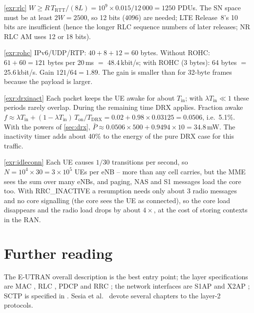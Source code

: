 \documentclass[11pt,a4paper]{article}
\begin{document}
\begin{solutionbox}{\ref{exr:rlc}}
$W \ge R\,T_{\mathrm{RTT}}/(8L) = 10^9\times0.015/12\,000 = 1250$ PDUs. The SN space must be at least
$2W = 2500$, so 12 bits ($4096$) are needed; LTE Release~8's 10 bits are insufficient (hence the
longer RLC sequence numbers of later releases; NR RLC AM uses 12 or 18 bits).
\end{solutionbox}

\begin{solutionbox}{\ref{exr:rohc}}
IPv6/UDP/RTP: $40+8+12 = 60$ bytes. Without ROHC: $61+60 = 121$ bytes per 20\,ms $=$ 48.4\,kbit/s;
with ROHC (3 bytes): 64 bytes $=$ 25.6\,kbit/s. Gain $121/64 = 1.89$. The gain is smaller than for
32-byte frames because the payload is larger.
\end{solutionbox}

\begin{solutionbox}{\ref{exr:drxinact}}
Each packet keeps the UE awake for about $T_{\mathrm{in}}$; with $\lambda T_{\mathrm{in}} \ll 1$ these
periods rarely overlap. During the remaining time DRX applies. Fraction awake
$f \approx \lambda T_{\mathrm{in}} + (1-\lambda T_{\mathrm{in}})\,T_{\mathrm{on}}/T_{\mathrm{DRX}}
= 0.02 + 0.98\times0.03125 = 0.0506$, i.e.\ 5.1\%. With the powers of \cref{sec:drx},
$\bar P \approx 0.0506\times500 + 0.9494\times10 = 34.8$\,mW. The inactivity timer adds about 40\% to
the energy of the pure DRX case for this traffic.
\end{solutionbox}

\begin{solutionbox}{\ref{exr:idleconn}}
Each UE causes $1/30$ transitions per second, so $N = 10^4\times30 = 3\times10^5$ UEs per eNB --
more than any cell carries, but the MME sees the sum over many eNBs, and paging, NAS and S1 messages
load the core too. With RRC\_INACTIVE a resumption needs only about 3 radio messages and no core
signalling (the core sees the UE as connected), so the core load disappears and the radio load drops
by about $4\times$, at the cost of storing contexts in the RAN.
\end{solutionbox}

\section{Further reading}
The E-UTRAN overall description \cite{ts36300} is the best entry point; the layer specifications are
MAC \cite{ts36321}, RLC \cite{ts36322}, PDCP \cite{ts36323} and RRC \cite{ts36331}; the network
interfaces are S1AP \cite{ts36413} and X2AP \cite{ts36423}; SCTP is specified in \cite{rfc9260}.
Sesia et al.\ \cite{sesia2011lte} devote several chapters to the layer-2 protocols.

\printbibliography[heading=subbibliography,title={\ACNstrRefs}]
\end{document}
